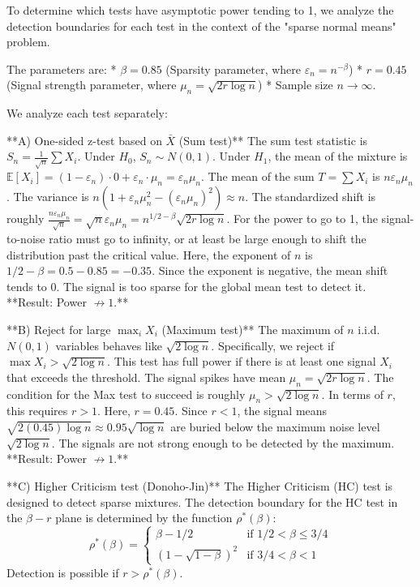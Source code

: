 To determine which tests have asymptotic power tending to 1, we analyze the detection boundaries for each test in the context of the "sparse normal means" problem.

The parameters are:
*   $\beta = 0.85$ (Sparsity parameter, where $\varepsilon_n = n^{-\beta}$)
*   $r = 0.45$ (Signal strength parameter, where $\mu_n = \sqrt{2r \log n}$)
*   Sample size $n \to \infty$.

We analyze each test separately:

**A) One-sided z-test based on $\bar{X}$ (Sum test)**
The sum test statistic is $S_n = \frac{1}{\sqrt{n}} \sum X_i$.
Under $H_0$, $S_n \sim N(0,1)$.
Under $H_1$, the mean of the mixture is $\mathbb{E}[X_i] = (1-\varepsilon_n) \cdot 0 + \varepsilon_n \cdot \mu_n = \varepsilon_n \mu_n$.
The mean of the sum $T = \sum X_i$ is $n \varepsilon_n \mu_n$. The variance is $n(1 + \varepsilon_n \mu_n^2 - (\varepsilon_n \mu_n)^2) \approx n$.
The standardized shift is roughly $\frac{n \varepsilon_n \mu_n}{\sqrt{n}} = \sqrt{n} \varepsilon_n \mu_n = n^{1/2 - \beta} \sqrt{2r \log n}$.
For the power to go to 1, the signal-to-noise ratio must go to infinity, or at least be large enough to shift the distribution past the critical value.
Here, the exponent of $n$ is $1/2 - \beta = 0.5 - 0.85 = -0.35$.
Since the exponent is negative, the mean shift tends to 0. The signal is too sparse for the global mean test to detect it.
**Result: Power $\not\to 1$.**

**B) Reject for large $\max_i X_i$ (Maximum test)**
The maximum of $n$ i.i.d. $N(0,1)$ variables behaves like $\sqrt{2 \log n}$.
Specifically, we reject if $\max X_i > \sqrt{2 \log n}$.
This test has full power if there is at least one signal $X_i$ that exceeds the threshold.
The signal spikes have mean $\mu_n = \sqrt{2r \log n}$.
The condition for the Max test to succeed is roughly $\mu_n > \sqrt{2 \log n}$.
In terms of $r$, this requires $r > 1$.
Here, $r = 0.45$. Since $r < 1$, the signal means $\sqrt{2(0.45)\log n} \approx 0.95 \sqrt{\log n}$ are buried below the maximum noise level $\sqrt{2 \log n}$. The signals are not strong enough to be detected by the maximum.
**Result: Power $\not\to 1$.**

**C) Higher Criticism test (Donoho-Jin)**
The Higher Criticism (HC) test is designed to detect sparse mixtures. The detection boundary for the HC test in the $\beta-r$ plane is determined by the function $\rho^*(\beta)$:
$$
\rho^*(\beta) = \begin{cases}
\beta - 1/2 & \text{if } 1/2 < \beta \le 3/4 \\
(1 - \sqrt{1-\beta})^2 & \text{if } 3/4 < \beta < 1
\end{cases}
$$
Detection is possible if $r > \rho^*(\beta)$.

